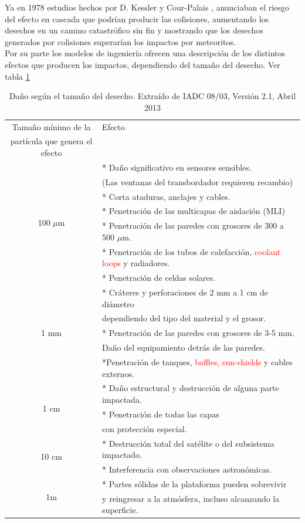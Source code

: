 Ya en 1978  estudios hechos por D. Kessler y Cour-Palais
 \cite{kessler0}, anunciaban el riesgo del efecto en cascada que podr\'ian producir las colisiones, aumentando los desechos en un camino catastr\'ofico sin fin y mostrando que los desechos generados por colisiones superar\'ian los impactos por meteoritos.\\
 
 Por su parte los modelos de ingenier\'ia ofrecen una descripci\'on de los distintos efectos que producen los impactos, dependiendo del tama\~no del desecho. Ver tabla \ref{tamanioDanio}\\
 
 \begin{table}[h]
\centering
\begin{tabular}[c]{|c l|}
\hline
\hline
Tama\~no m\'inimo de la  &    Efecto\\
part\'icula que genera el efecto & \\
\hline
\hline
\multirow{ 7}{*}{100 $\mu$m }& * Da\~no significativo en sensores sensibles.\\
& (Las ventanas del transbordador requieren recambio)\\
& * Corta ataduras, anclajes y cables.\\
& * Penetraci\'on de las multicapas de aislaci\'on (MLI)\\
& * Penetraci\'on de las paredes con grosores de 300 a 500 $\mu$m.\\
& * Penetraci\'on de los tubos de calefacci\'on, \textcolor{red}{coolant loops} y radiadores.\\
& * Penetraci\'on de celdas solares.\\
\hline 
\multirow{ 5}{*}{1 mm }& * Cr\'ateres y perforaciones de 2 mm a 1 cm de di\'ametro\\
& dependiendo del tipo del material y el grosor.\\
& * Penetraci\'on de las paredes con grosores de 3-5 mm.\\
& Da\~no del equipamiento detr\'as de las paredes.\\
& *Penetraci\'on de tanques, \textcolor{red}{baffles, sun-shields} y cables externos.\\
\hline
\multirow{ 3}{*}{1 cm } & * Da\~no estructural y destrucci\'on de alguna parte impactada.\\
& * Penetraci\'on de todas las capas\\ %
& con protecci\'on especial.\\
\hline
\multirow{ 2}{*}{10 cm } & * Destrucci\'on total del sat\'elite o del subsistema impactado.\\
& * Interferencia con observaciones astron\'omicas.\\
\hline
\multirow{ 2}{*}{1m}& * Partes s\'olidas de la plataforma pueden sobrevivir\\
& y reingresar a la atmósfera, incluso alcanzando la superficie.\\
\hline
\end{tabular}
\caption[Da\~no seg\'un el tama\~no del desecho.]{Da\~no seg\'un el tama\~no del desecho. Extra\'ido de IADC 08/03, Versi\'on 2.1, Abril 2013}
\label{tamanioDanio}
\end{table}

